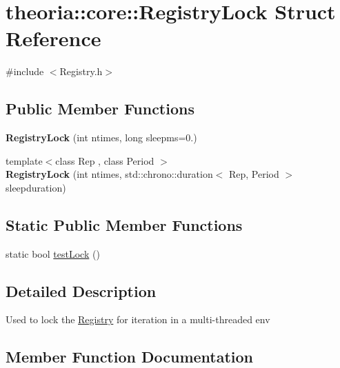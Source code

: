 \hypertarget{structtheoria_1_1core_1_1RegistryLock}{}\section{theoria\+:\+:core\+:\+:Registry\+Lock Struct Reference}
\label{structtheoria_1_1core_1_1RegistryLock}


{\ttfamily \#include $<$Registry.\+h$>$}

\subsection*{Public Member Functions}
\begin{DoxyCompactItemize}
\item 
\mbox{\label{structtheoria_1_1core_1_1RegistryLock_a207ca3d063dd8aa9864a69c8bfc7d37d}} 
{\bfseries Registry\+Lock} (int ntimes, long sleepms=0.)
\item 
\mbox{\label{structtheoria_1_1core_1_1RegistryLock_a125ee48beb0368158dc4a38716196d5c}} 
{\footnotesize template$<$class Rep , class Period $>$ }\\{\bfseries Registry\+Lock} (int ntimes, std\+::chrono\+::duration$<$ Rep, Period $>$ sleepduration)
\end{DoxyCompactItemize}
\subsection*{Static Public Member Functions}
\begin{DoxyCompactItemize}
\item 
static bool \hyperlink{structtheoria_1_1core_1_1RegistryLock_a28e3a44cfa3ef223db18db201e635254}{test\+Lock} ()
\end{DoxyCompactItemize}


\subsection{Detailed Description}
Used to lock the \hyperlink{classtheoria_1_1core_1_1Registry}{Registry} for iteration in a multi-\/threaded env 

\subsection{Member Function Documentation}
\mbox{\label{structtheoria_1_1core_1_1RegistryLock_a28e3a44cfa3ef223db18db201e635254}} 
